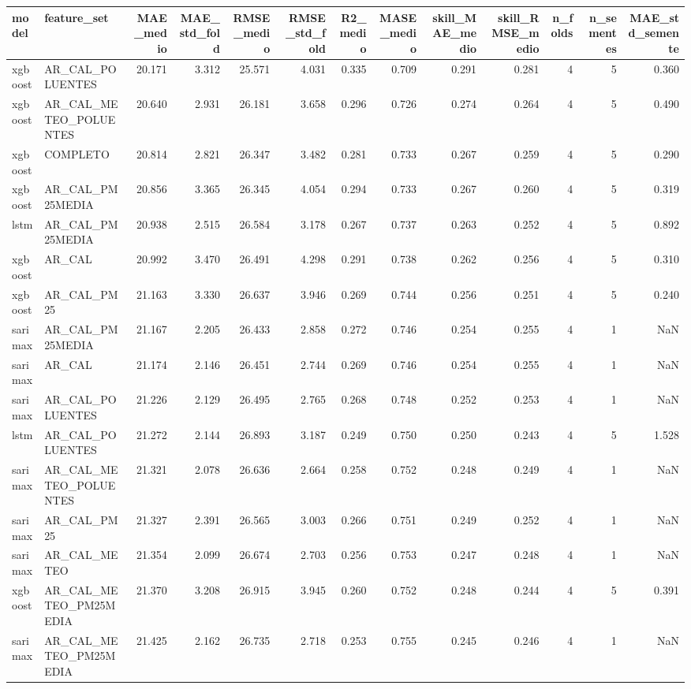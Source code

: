 \begin{tabular}{llrrrrrrrrrrr}
\toprule
model & feature_set & MAE_medio & MAE_std_fold & RMSE_medio & RMSE_std_fold & R2_medio & MASE_medio & skill_MAE_medio & skill_RMSE_medio & n_folds & n_sementes & MAE_std_semente \\
\midrule
xgboost & AR_CAL_POLUENTES & 20.171 & 3.312 & 25.571 & 4.031 & 0.335 & 0.709 & 0.291 & 0.281 & 4 & 5 & 0.360 \\
xgboost & AR_CAL_METEO_POLUENTES & 20.640 & 2.931 & 26.181 & 3.658 & 0.296 & 0.726 & 0.274 & 0.264 & 4 & 5 & 0.490 \\
xgboost & COMPLETO & 20.814 & 2.821 & 26.347 & 3.482 & 0.281 & 0.733 & 0.267 & 0.259 & 4 & 5 & 0.290 \\
xgboost & AR_CAL_PM25MEDIA & 20.856 & 3.365 & 26.345 & 4.054 & 0.294 & 0.733 & 0.267 & 0.260 & 4 & 5 & 0.319 \\
lstm & AR_CAL_PM25MEDIA & 20.938 & 2.515 & 26.584 & 3.178 & 0.267 & 0.737 & 0.263 & 0.252 & 4 & 5 & 0.892 \\
xgboost & AR_CAL & 20.992 & 3.470 & 26.491 & 4.298 & 0.291 & 0.738 & 0.262 & 0.256 & 4 & 5 & 0.310 \\
xgboost & AR_CAL_PM25 & 21.163 & 3.330 & 26.637 & 3.946 & 0.269 & 0.744 & 0.256 & 0.251 & 4 & 5 & 0.240 \\
sarimax & AR_CAL_PM25MEDIA & 21.167 & 2.205 & 26.433 & 2.858 & 0.272 & 0.746 & 0.254 & 0.255 & 4 & 1 & NaN \\
sarimax & AR_CAL & 21.174 & 2.146 & 26.451 & 2.744 & 0.269 & 0.746 & 0.254 & 0.255 & 4 & 1 & NaN \\
sarimax & AR_CAL_POLUENTES & 21.226 & 2.129 & 26.495 & 2.765 & 0.268 & 0.748 & 0.252 & 0.253 & 4 & 1 & NaN \\
lstm & AR_CAL_POLUENTES & 21.272 & 2.144 & 26.893 & 3.187 & 0.249 & 0.750 & 0.250 & 0.243 & 4 & 5 & 1.528 \\
sarimax & AR_CAL_METEO_POLUENTES & 21.321 & 2.078 & 26.636 & 2.664 & 0.258 & 0.752 & 0.248 & 0.249 & 4 & 1 & NaN \\
sarimax & AR_CAL_PM25 & 21.327 & 2.391 & 26.565 & 3.003 & 0.266 & 0.751 & 0.249 & 0.252 & 4 & 1 & NaN \\
sarimax & AR_CAL_METEO & 21.354 & 2.099 & 26.674 & 2.703 & 0.256 & 0.753 & 0.247 & 0.248 & 4 & 1 & NaN \\
xgboost & AR_CAL_METEO_PM25MEDIA & 21.370 & 3.208 & 26.915 & 3.945 & 0.260 & 0.752 & 0.248 & 0.244 & 4 & 5 & 0.391 \\
sarimax & AR_CAL_METEO_PM25MEDIA & 21.425 & 2.162 & 26.735 & 2.718 & 0.253 & 0.755 & 0.245 & 0.246 & 4 & 1 & NaN \\

\end{tabular}
